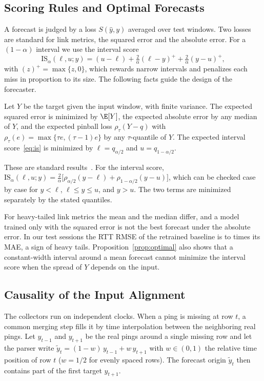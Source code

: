 \subsection{Scoring Rules and Optimal Forecasts}
A forecast is judged by a loss $S(\hat{y},y)$ averaged over test windows. Two losses are standard for link metrics, the squared error and the absolute error. For a $(1-\alpha)$ interval we use the interval score~\cite{gneiting2007strictly}
\begin{equation}
\mathrm{IS}_\alpha(\ell,u;y)=(u-\ell)+\tfrac{2}{\alpha}(\ell-y)^{+}+\tfrac{2}{\alpha}(y-u)^{+},
\label{eq:is}
\end{equation}
with $(z)^+=\max\{z,0\}$, which rewards narrow intervals and penalizes each miss in proportion to its size. The following facts guide the design of the forecaster.

\begin{proposition}
\label{prop:optimal}
Let $Y$ be the target given the input window, with finite variance. The expected squared error is minimized by $\E[Y]$, the expected absolute error by any median of $Y$, and the expected pinball loss $\rho_\tau(Y-q)$ with $\rho_\tau(e)=\max\{\tau e,(\tau-1)e\}$ by any $\tau$-quantile of $Y$. The expected interval score~\eqref{eq:is} is minimized by $\ell=q_{\alpha/2}$ and $u=q_{1-\alpha/2}$.
\end{proposition}
\begin{IEEEproof}
These are standard results~\cite{gneiting2011making,koenker1978regression}. For the interval score, $\mathrm{IS}_\alpha(\ell,u;y)=\frac{2}{\alpha}\big[\rho_{\alpha/2}(y-\ell)+\rho_{1-\alpha/2}(y-u)\big]$, which can be checked case by case for $y<\ell$, $\ell\le y\le u$, and $y>u$. The two terms are minimized separately by the stated quantiles.
\end{IEEEproof}

For heavy-tailed link metrics the mean and the median differ, and a model trained only with the squared error is not the best forecast under the absolute error. In our test sessions the RTT RMSE of the retrained baseline is \RatioRMSEMAEMin{} to \RatioRMSEMAEMax{} times its MAE, a sign of heavy tails. Proposition~\ref{prop:optimal} also shows that a constant-width interval around a mean forecast cannot minimize the interval score when the spread of $Y$ depends on the input.

\subsection{Causality of the Input Alignment}
\label{sec:causal}
The collectors run on independent clocks. When a ping is missing at row $t$, a common merging step fills it by time interpolation between the neighboring real pings. Let $y_{t-1}$ and $y_{t+1}$ be the real pings around a single missing row and let the parser write $\tilde{y}_t=(1-w)\,y_{t-1}+w\,y_{t+1}$ with $w\in(0,1)$ the relative time position of row $t$ ($w=1/2$ for evenly spaced rows). The forecast origin $\tilde{y}_t$ then contains part of the first target $y_{t+1}$.

